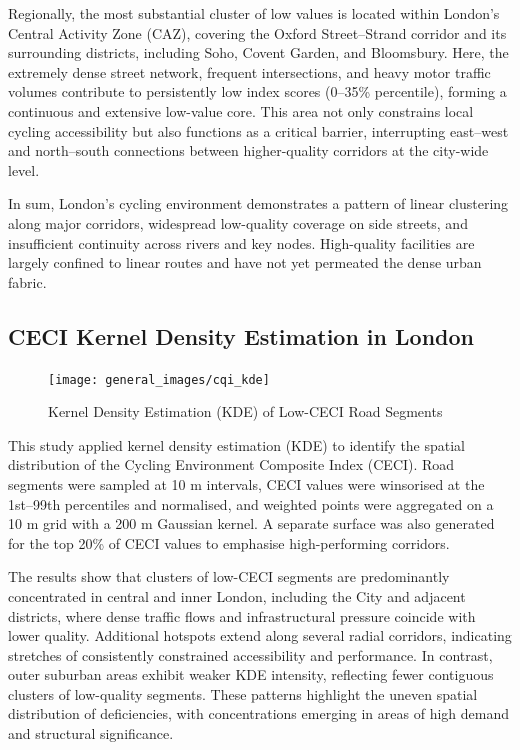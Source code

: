 \documentclass[
  12pt,
  oneside]{book}
\begin{document}
Regionally, the most substantial cluster of low values is located within London's Central Activity Zone (CAZ), covering the Oxford Street--Strand corridor and its surrounding districts, including Soho, Covent Garden, and Bloomsbury. Here, the extremely dense street network, frequent intersections, and heavy motor traffic volumes contribute to persistently low index scores (0--35\% percentile), forming a continuous and extensive low-value core. This area not only constrains local cycling accessibility but also functions as a critical barrier, interrupting east--west and north--south connections between higher-quality corridors at the city-wide level.

In sum, London's cycling environment demonstrates a pattern of linear clustering along major corridors, widespread low-quality coverage on side streets, and insufficient continuity across rivers and key nodes. High-quality facilities are largely confined to linear routes and have not yet permeated the dense urban fabric.

\subsection{CECI Kernel Density Estimation in London}\label{ceci-kernel-density-estimation-in-london}

\begin{figure}

{\centering \texttt{[image: general\_images/cqi\_kde]} 

}

\caption{Kernel Density Estimation (KDE) of Low-CECI Road Segments}\label{fig:kde}
\end{figure}

This study applied kernel density estimation (KDE) to identify the spatial distribution of the Cycling Environment Composite Index (CECI). Road segments were sampled at 10 m intervals, CECI values were winsorised at the 1st--99th percentiles and normalised, and weighted points were aggregated on a 10 m grid with a 200 m Gaussian kernel. A separate surface was also generated for the top 20\% of CECI values to emphasise high-performing corridors.

The results show that clusters of low-CECI segments are predominantly concentrated in central and inner London, including the City and adjacent districts, where dense traffic flows and infrastructural pressure coincide with lower quality. Additional hotspots extend along several radial corridors, indicating stretches of consistently constrained accessibility and performance. In contrast, outer suburban areas exhibit weaker KDE intensity, reflecting fewer contiguous clusters of low-quality segments. These patterns highlight the uneven spatial distribution of deficiencies, with concentrations emerging in areas of high demand and structural significance.
\end{document}
